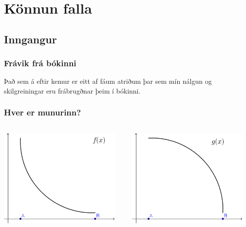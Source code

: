 \documentclass[icelandic,a4paper,12pt]{article}
\date{29. ágúst 2015}
\begin{document}
\setcounter{tocdepth}{2}
\tableofcontents


\section{Könnun falla}

\subsection{Inngangur}
\subsubsection{Frávik frá bókinni}
Það sem á eftir kemur er eitt af fáum atriðum þar sem
mín nálgun og skilgreiningar eru frábrugðnar þeim í 
bókinni.

\subsubsection{Hver er munurinn?}
\begin{center}
\begin{columns}[c] %
\begin{column}{.5\textwidth}
\includegraphics[width=6cm,keepaspectratio=true]{./myndir/kafli05/01_f1.png}
\end{column}
\begin{column}{.5\textwidth}
\includegraphics[width=6cm,keepaspectratio=true]{./myndir/kafli05/01_g1.png}
\end{column}
\end{columns}
\end{center}
\end{document}
